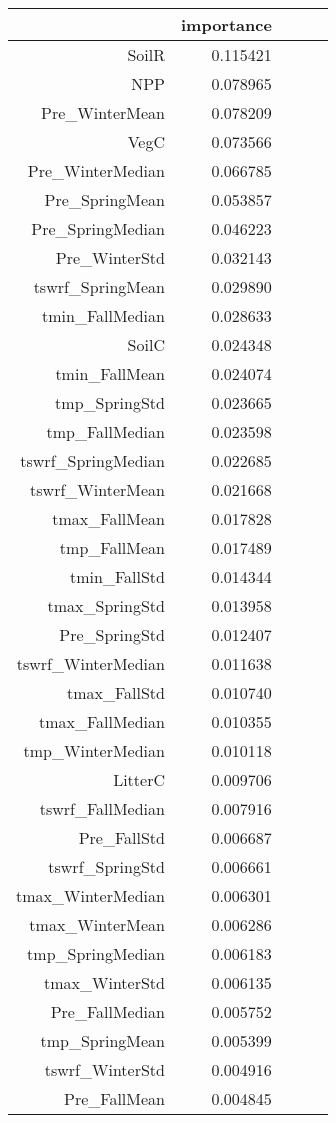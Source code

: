 \begin{tabular}{rrrrr}
\toprule
 & importance \\
\midrule
SoilR & 0.115421 \\
NPP & 0.078965 \\
Pre_WinterMean & 0.078209 \\
VegC & 0.073566 \\
Pre_WinterMedian & 0.066785 \\
Pre_SpringMean & 0.053857 \\
Pre_SpringMedian & 0.046223 \\
Pre_WinterStd & 0.032143 \\
tswrf_SpringMean & 0.029890 \\
tmin_FallMedian & 0.028633 \\
SoilC & 0.024348 \\
tmin_FallMean & 0.024074 \\
tmp_SpringStd & 0.023665 \\
tmp_FallMedian & 0.023598 \\
tswrf_SpringMedian & 0.022685 \\
tswrf_WinterMean & 0.021668 \\
tmax_FallMean & 0.017828 \\
tmp_FallMean & 0.017489 \\
tmin_FallStd & 0.014344 \\
tmax_SpringStd & 0.013958 \\
Pre_SpringStd & 0.012407 \\
tswrf_WinterMedian & 0.011638 \\
tmax_FallStd & 0.010740 \\
tmax_FallMedian & 0.010355 \\
tmp_WinterMedian & 0.010118 \\
LitterC & 0.009706 \\
tswrf_FallMedian & 0.007916 \\
Pre_FallStd & 0.006687 \\
tswrf_SpringStd & 0.006661 \\
tmax_WinterMedian & 0.006301 \\
tmax_WinterMean & 0.006286 \\
tmp_SpringMedian & 0.006183 \\
tmax_WinterStd & 0.006135 \\
Pre_FallMedian & 0.005752 \\
tmp_SpringMean & 0.005399 \\
tswrf_WinterStd & 0.004916 \\
Pre_FallMean & 0.004845 \\

\end{tabular}
